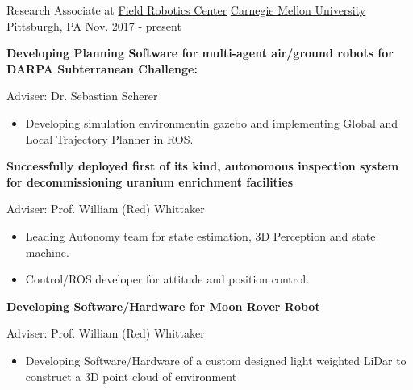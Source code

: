 



\begin{cventries}







  \cventry
    {Research Associate at \href{https://www.frc.ri.cmu.edu/}{Field Robotics Center}} %
    {\href{https://www.ri.cmu.edu/}{Carnegie Mellon University}} %
    {Pittsburgh, PA} %
    {Nov. 2017 - present} %
    {
      \begin{cvitems} %
      	\item \textbf{Developing Planning Software for multi-agent air/ground robots for DARPA Subterranean Challenge:} \begin{flushright} {\color{awesome} Adviser: Dr. Sebastian Scherer} \end{flushright}
		\begin{itemize}
			\item Developing simulation environmentin gazebo and implementing Global and Local Trajectory Planner in ROS.
		\end{itemize}	
		\item \textbf{Successfully deployed first of its kind, autonomous inspection system for decommissioning
uranium enrichment facilities} \begin{flushright} {\color{awesome} Adviser: Prof. William (Red) Whittaker} \end{flushright}
		\begin{itemize}
			\item Leading Autonomy team  for state estimation, 3D Perception and state machine.
			\item Control/ROS developer for attitude and position control.
		\end{itemize}
		\item \textbf{Developing Software/Hardware for Moon Rover Robot} \begin{flushright} {\color{awesome} Adviser: Prof. William (Red) Whittaker} \end{flushright}
		\begin{itemize}
			\item Developing Software/Hardware of a custom designed light weighted LiDar to construct a 3D point cloud of environment
		\end{itemize}
      \end{cvitems}
    }






\end{cventries}
